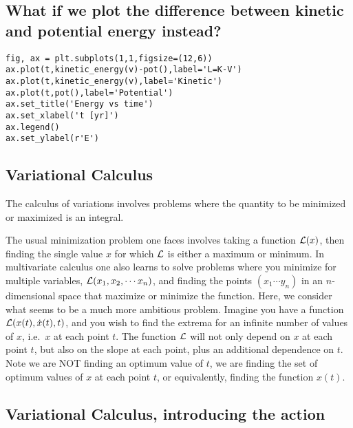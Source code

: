 \documentclass[%
oneside,                 %
final,                   %
10pt]{article}
\begin{document}
\subsection*{What if we plot the difference between kinetic and potential energy instead?}










\begin{verbatim}
fig, ax = plt.subplots(1,1,figsize=(12,6))
ax.plot(t,kinetic_energy(v)-pot(),label='L=K-V')
ax.plot(t,kinetic_energy(v),label='Kinetic')
ax.plot(t,pot(),label='Potential')
ax.set_title('Energy vs time')
ax.set_xlabel('t [yr]')
ax.legend()
ax.set_ylabel(r'E')

\end{verbatim}


\subsection*{Variational Calculus}

The calculus of variations involves 
problems where the quantity to be minimized or maximized is an integral. 

The usual minimization problem one faces involves taking a function
${\cal L}(x)$, then finding the single value $x$ for which ${\cal L}$
is either a maximum or minimum. In multivariate calculus one also
learns to solve problems where you minimize for multiple variables,
${\cal L}(x_1,x_2,\cdots x_n)$, and finding the points $(x_1\cdots
y_n)$ in an $n$-dimensional space that maximize or minimize the
function. Here, we consider what seems to be a much more ambitious
problem. Imagine you have a function ${\cal L}(x(t),\dot{x}(t),t)$,
and you wish to find the extrema for an infinite number of values of
$x$, i.e.~$x$ at each point $t$. The function ${\cal L}$ will not only
depend on $x$ at each point $t$, but also on the slope at each point,
plus an additional dependence on $t$. Note we are NOT finding an
optimum value of $t$, we are finding the set of optimum values of $x$
at each point $t$, or equivalently, finding the function $x(t)$.

\subsection*{Variational Calculus, introducing the action}
\end{document}
